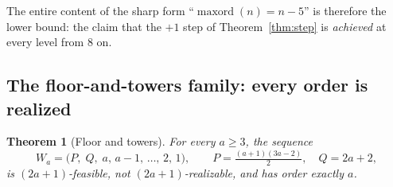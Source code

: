 \documentclass[11pt]{article}
\newtheorem{theorem}{Theorem}[section]
\theoremstyle{definition}
\theoremstyle{remark}
\newcommand{\maxord}{\operatorname{maxord}}
\begin{document}
The entire content of the sharp form ``$\maxord(n)=n-5$'' is therefore the lower
bound: the claim that the $+1$ step of Theorem~\ref{thm:step} is \emph{achieved} at
every level from $8$ on.

\subsection{The floor-and-towers family: every order is realized}

\begin{theorem}[Floor and towers]\label{thm:Wa}
For every $a\ge3$, the sequence
\[
W_a=\bigl(P,\;Q,\;a,\,a-1,\,\dots,\,2,\,1\bigr),\qquad
P=\tfrac{(a+1)(3a-2)}{2},\quad Q=2a+2,
\]
is $(2a{+}1)$-feasible, not $(2a{+}1)$-realizable, and has order exactly $a$.
\end{theorem}
\end{document}
